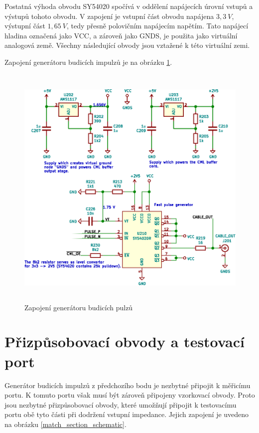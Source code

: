 Postatná výhoda obvodu SY54020 spočívá v oddělení napájecích úrovní vstupů a výstupů tohoto obvodu. V zapojení je vstupní část obvodu napájena $3{,}3~\si{V}$, výstupní část $1{,}65~\si{V}$, tedy přesně polovičním napájecím napětím. Tato napájecí hladina označená jako VCC, a zároveň jako GNDS, je použita jako virtuální analogová země. Všechny následující obvody jsou vztažené k této virtuální zemi.

Zapojení generátoru budicích impulzů je na obrázku \ref{pulse_generator_section_schematic}.

\begin{figure}[htbp]
\includegraphics[width=\textwidth,height=12cm,keepaspectratio]{images/pulse_generator_section.eps}\caption{Zapojení generátoru budicích pulzů}\label{pulse_generator_section_schematic}
\end{figure}	

\section{Přizpůsobovací obvody a testovací port}
Generátor budicích impulzů z předchozího bodu je nezbytné připojit k měřicímu portu. K tomuto portu však musí být zároveň připojeny vzorkovací obvody. Proto jsou nezbytné přizpůsobovací obvody, které umožňují připojit k testovacímu portu obě tyto části při dodržení vstupní impedance. Jejich zapojení je uvedeno na obrázku \ref{match_section_schematic}.

